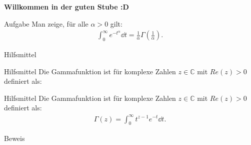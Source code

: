 \documentclass[10pt]{beamer}
\title{}
\author{Artur's \( \oint \) Mathematikstübchen}
\date{}
\def\bC{\mathbb{C}}
\begin{document}

\begin{frame}
    \begin{center}
        \textbf{\huge Willkommen in der guten Stube \newline \newline :D}
    \end{center}
\end{frame}




\begin{frame}
    \begin{alertblock}{Aufgabe}
        Man zeige, für alle \( \alpha > 0 \) gilt:
        \begin{align*}
            \int_{0}^{\infty} e^{-t^{\alpha}} \dd{t}
            = \frac{1}{\alpha} \Gamma\left( \frac{1}{\alpha} \right).
        \end{align*}
    \end{alertblock}
\end{frame}



\begin{frame}{Hilfsmittel}
    
\end{frame}



\begin{frame}{Hilfsmittel}
    Die Gammafunktion ist für komplexe Zahlen \( z \in \bC \) mit \( Re(z) > 0 \) definiert als:
\end{frame}



\begin{frame}{Hilfsmittel}
    Die Gammafunktion ist für komplexe Zahlen \( z \in \bC \) mit \( Re(z) > 0 \) definiert als:
    \begin{align*}
        \Gamma( z ) 
        =  \int_{0}^{\infty} t^{z - 1}e^{-t} \dd{t}.
    \end{align*}
\end{frame}




\begin{frame}{Beweis}
    
\end{frame}
\end{document}
